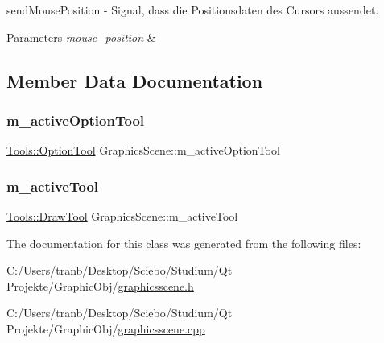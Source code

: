 send\+Mouse\+Position -\/ Signal, dass die Positionsdaten des Cursors aussendet. 


\begin{DoxyParams}{Parameters}
{\em mouse\+\_\+position} & \\
\hline
\end{DoxyParams}


\subsection{Member Data Documentation}
\mbox{\label{class_graphics_scene_ad17292fb79972e11c2a829da9baf3dca}} 
\subsubsection{\texorpdfstring{m\+\_\+active\+Option\+Tool}{m\_activeOptionTool}}
{\footnotesize\ttfamily \hyperlink{class_tools_a4b55b2ca4eef4d80ae1042233832bb8b}{Tools\+::\+Option\+Tool} Graphics\+Scene\+::m\+\_\+active\+Option\+Tool\hspace{0.3cm}{\ttfamily [protected]}}

\mbox{\label{class_graphics_scene_aea13f23ba3e463916435ec72eb381207}} 
\subsubsection{\texorpdfstring{m\+\_\+active\+Tool}{m\_activeTool}}
{\footnotesize\ttfamily \hyperlink{class_tools_ab031688a77e89a80ce8b5db7014684a3}{Tools\+::\+Draw\+Tool} Graphics\+Scene\+::m\+\_\+active\+Tool\hspace{0.3cm}{\ttfamily [protected]}}



The documentation for this class was generated from the following files\+:\begin{DoxyCompactItemize}
\item 
C\+:/\+Users/tranb/\+Desktop/\+Sciebo/\+Studium/\+Qt Projekte/\+Graphic\+Obj/\hyperlink{graphicsscene_8h}{graphicsscene.\+h}\item 
C\+:/\+Users/tranb/\+Desktop/\+Sciebo/\+Studium/\+Qt Projekte/\+Graphic\+Obj/\hyperlink{graphicsscene_8cpp}{graphicsscene.\+cpp}\end{DoxyCompactItemize}
